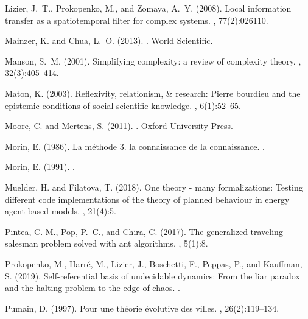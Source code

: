 \documentclass[graybox]{svmult}
\begin{document}
\begin{thebibliography}{}
Lizier, J.~T., Prokopenko, M., and Zomaya, A.~Y. (2008).
\newblock Local information transfer as a spatiotemporal filter for complex
  systems.
, 77(2):026110.

Mainzer, K. and Chua, L.~O. (2013).
.
\newblock World Scientific.

Manson, S.~M. (2001).
\newblock Simplifying complexity: a review of complexity theory.
, 32(3):405--414.

Maton, K. (2003).
\newblock Reflexivity, relationism, \& research: Pierre bourdieu and the
  epistemic conditions of social scientific knowledge.
, 6(1):52--65.

Moore, C. and Mertens, S. (2011).
.
\newblock Oxford University Press.

Morin, E. (1986).
\newblock La m{\'e}thode 3. la connaissance de la connaissance.
.

Morin, E. (1991).
.

Muelder, H. and Filatova, T. (2018).
\newblock One theory - many formalizations: Testing different code
  implementations of the theory of planned behaviour in energy agent-based
  models.
, 21(4):5.

Pintea, C.-M., Pop, P.~C., and Chira, C. (2017).
\newblock The generalized traveling salesman problem solved with ant
  algorithms.
, 5(1):8.

Prokopenko, M., Harré, M., Lizier, J., Boschetti, F., Peppas, P., and
  Kauffman, S. (2019).
\newblock Self-referential basis of undecidable dynamics: From the liar paradox
  and the halting problem to the edge of chaos.
.

Pumain, D. (1997).
\newblock Pour une th{\'e}orie {\'e}volutive des villes.
, 26(2):119--134.


\end{thebibliography}
\end{document}
